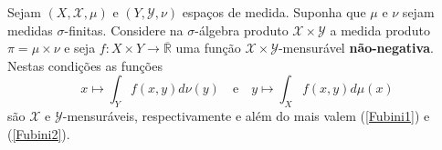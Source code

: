 \begin{teorema}[Tonelli]\label{Tonelli}
Sejam $(X, \mathscr{X}, \mu)$ e $(Y, \mathscr{Y}, \nu)$
espaços de medida. 
Suponha que $\mu$ e $\nu$ sejam medidas $\sigma$-finitas. 
Considere na $\sigma$-álgebra produto $\mathscr{X}\times \mathscr{Y}$ 
a medida produto $\pi = \mu\times \nu$ e seja $f:X\times Y\to \overline{\mathbb{R}}$ 
uma função $\mathscr{X}\times \mathscr{Y}$-mensurável 
\textbf{não-negativa}. Nestas condições as funções 
\begin{equation}\label{sec-int-mensuraveis-teo-tonelli}
x\mapsto \int_Y f(x,y) d\nu(y)
\quad\text{e}\quad
y\mapsto \int_X f(x,y) d\mu(x)
\end{equation}
são $\mathscr{X}$ e $\mathscr{Y}$-mensuráveis, respectivamente
e além do mais valem (\ref{Fubini1}) e (\ref{Fubini2}). 
\end{teorema}





